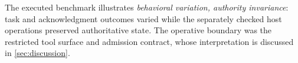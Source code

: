 The executed benchmark illustrates \emph{behavioral variation, authority invariance}: task and acknowledgment outcomes varied while the separately checked host operations preserved authoritative state. The operative boundary was the restricted tool surface and admission contract, whose interpretation is discussed in \cref{sec:discussion}.
